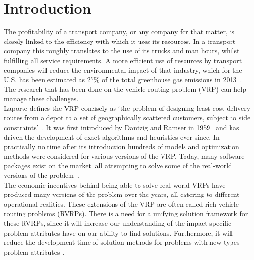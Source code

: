 \section{Introduction}
The profitability of a transport company, or any company for that matter, is closely linked to the efficiency with which it uses its resources.
In a transport company this roughly translates to
the use of its trucks and man hours, whilst fulfilling all service requirements.
A more efficient use of resources by transport companies will reduce the environmental impact of that industry, which for the U.S. has been estimated as 27\% of the total greenhouse gas emissions in 2013~\cite{inventory1990}.
The research that has been done on the vehicle routing problem (VRP) can help manage these challenges. \\

Laporte defines the VRP concisely as `the problem of designing least-cost delivery routes from a depot to a set of geographically scattered customers, subject to side constraints'~\cite{laporte2009fifty}. It was first introduced by Dantzig and Ramser in 1959~\cite{dantzig1959truck} and has driven the development of exact algorithms and heuristics ever since. In practically no time after its introduction hundreds of models  and optimization methods were considered for various versions of the VRP. Today, many software packages exist on the market, all attempting to solve some of the real-world versions of the problem~\cite{toth2014vehicle}. \\

The economic incentives behind being able to solve real-world VRPs have produced many versions of the problem over the years, all catering to different operational realities. These  extensions of the VRP are often called rich vehicle routing problems (RVRPs).
There is a need for a unifying solution framework for these RVRPs, since it will increase our understanding of the impact specific problem attributes have on our ability to find solutions. Furthermore, it will reduce the development time of solution methods for problems with new types problem attributes \cite{vidal2014unified}.\\


